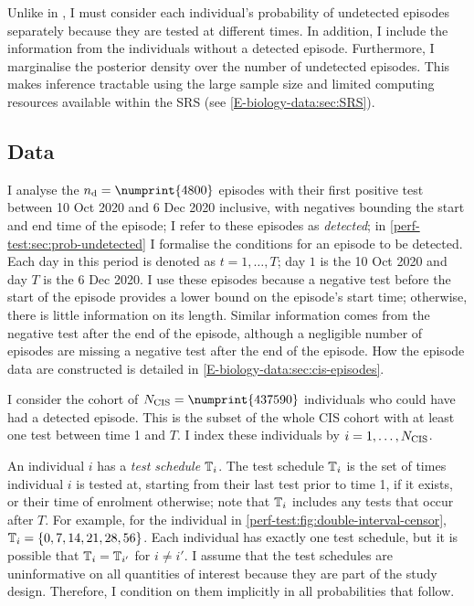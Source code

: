 \documentclass[thesis.tex]{subfiles}
\begin{document}
Unlike in \textcite{heiseyModelling}, I must consider each individual's probability of undetected episodes separately because they are tested at different times.
In addition, I include the information from the individuals without a detected episode.
Furthermore, I marginalise the posterior density over the number of undetected episodes.
This makes inference tractable using the large sample size and limited computing resources available within the SRS (see \cref{E-biology-data:sec:SRS}).

\subsection{Data} \label{perf-test:sec:data}

I analyse the $\ndet = \numprint{4800}$ episodes with their first positive test between 10 Oct 2020 and 6 Dec 2020 inclusive, with negatives bounding the start and end time of the episode; I refer to these episodes as \emph{detected}; in \cref{perf-test:sec:prob-undetected} I formalise the conditions for an episode to be detected.
Each day in this period is denoted as $t = 1, \dots, T$; \ie day $1$ is the 10 Oct 2020 and day $T$ is the 6 Dec 2020.
I use these episodes because a negative test before the start of the episode provides a lower bound on the episode's start time; otherwise, there is little information on its length.
Similar information comes from the negative test after the end of the episode, although a negligible number of episodes are missing a negative test after the end of the episode.
How the episode data are constructed is detailed in \cref{E-biology-data:sec:cis-episodes}.

I consider the cohort of $\Ncis = \numprint{437590}$ individuals who could have had a detected episode.
This is the subset of the whole CIS cohort with at least one test between time 1 and $T$.
I index these individuals by $i = 1, \dots, N_\text{CIS}$.

An individual $i$ has a \emph{test schedule} $\mathbb{T}_i$.
The test schedule $\mathbb{T}_i$ is the set of times individual $i$ is tested at, starting from their last test prior to time 1, if it exists, or their time of enrolment otherwise; note that $\mathbb{T}_i$ includes any tests that occur after $T$.
For example, for the individual in \cref{perf-test:fig:double-interval-censor}, $\mathbb{T}_i = \{ 0, 7, 14, 21, 28, 56 \}$.
Each individual has exactly one test schedule, but it is possible that $\mathbb{T}_i = \mathbb{T}_{i'}$ for $i \neq i'$.
I assume that the test schedules are uninformative on all quantities of interest because they are part of the study design.
Therefore, I condition on them implicitly in all probabilities that follow.
\end{document}
